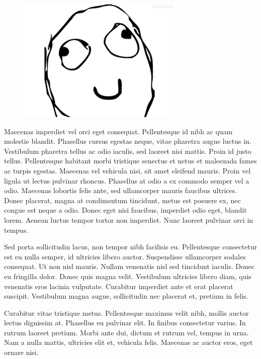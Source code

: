 \documentclass{article}
\begin{document}
\begin{figure}[h] \includegraphics{meme.png} \centering \end{figure}

 Maecenas imperdiet vel orci eget consequat. Pellentesque id nibh ac quam molestie blandit. Phasellus cursus egestas neque, vitae pharetra augue luctus in. Vestibulum pharetra tellus ac odio iaculis, sed laoreet nisi mattis. Proin id justo tellus. Pellentesque habitant morbi tristique senectus et netus et malesuada fames ac turpis egestas. Maecenas vel vehicula nisi, sit amet eleifend mauris. Proin vel ligula ut lectus pulvinar rhoncus. Phasellus at odio a ex commodo semper vel a odio. Maecenas lobortis felis ante, sed ullamcorper mauris faucibus ultrices. Donec placerat, magna at condimentum tincidunt, metus est posuere ex, nec congue est neque a odio. Donec eget nisi faucibus, imperdiet odio eget, blandit lorem. Aenean luctus tempor tortor non imperdiet. Nunc laoreet pulvinar orci in tempus. 



 Sed porta sollicitudin lacus, non tempor nibh facilisis eu. Pellentesque consectetur est eu nulla semper, id ultricies libero auctor. Suspendisse ullamcorper sodales consequat. Ut non nisl mauris. Nullam venenatis nisl sed tincidunt iaculis. Donec eu fringilla dolor. Donec quis magna velit. Vestibulum ultricies libero diam, quis venenatis eros lacinia vulputate. Curabitur imperdiet ante et erat placerat suscipit. Vestibulum magna augue, sollicitudin nec placerat et, pretium in felis. 



 Curabitur vitae tristique metus. Pellentesque maximus velit nibh, mollis auctor lectus dignissim at. Phasellus eu pulvinar elit. In finibus consectetur varius. In rutrum laoreet pretium. Morbi ante dui, dictum et rutrum vel, tempus in urna. Nam a nulla mattis, ultricies elit et, vehicula felis. Maecenas ac auctor eros, eget ornare nisi. 
\end{document}
